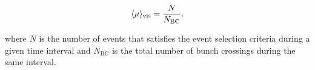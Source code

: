 \begin{equation}
  \langle\mu\rangle_{\text{vis}} = \frac{N}{N_{\text{BC}}},
  \label{LumiVisibleMuSmall}
\end{equation}

\noindent where $N$ is the number of events that satisfies the event selection criteria during a given time interval and $N_{\text{BC}}$ is the total number of bunch crossings during the same interval.
